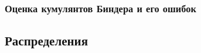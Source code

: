  
 \subsubsection{Оценка кумулянтов Биндера и его ошибок}
 
% 
% 
%  
%  
% 
%   
%   
%   
% 
% 
% 
% 
%  
% 
 

\subsection{Распределения}


